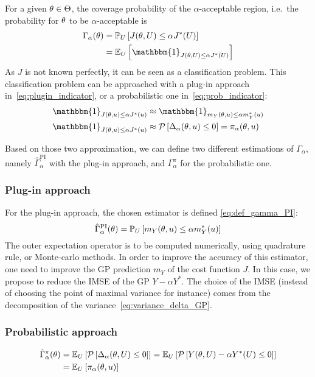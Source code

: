 \documentclass[../../Main_ManuscritThese.tex]{subfiles}
\begin{document}
For a given $\theta\in\Theta$, the coverage probability of the $\alpha$-acceptable region, i.e.\ the probability for $\theta$ to be $\alpha$-acceptable is
\begin{align}
  \Gamma_{\alpha}(\kk) &= \Prob_{U}\left[J(\kk,\UU) \leq \alpha J^*(\UU)\right] \\
                              & =\Ex_{U}\left[\mathbbm{1}_{J(\kk,\UU) \leq \alpha J^*(\UU)}\right]
\end{align}
As $J$ is not known perfectly, it can be seen as a classification problem.
This classification problem can be approached with a plug-in approach in~\cref{eq:plugin_indicator}, or a probabilistic one in~\cref{eq:prob_indicator}:
\begin{align}
  \mathbbm{1}_{J(\kk,\uu) \leq \alpha J^*(\uu)} &\approx   \mathbbm{1}_{m_Y(\kk,\uu) \leq \alpha m_Y^*(\uu)} \label{eq:plugin_indicator} \\
  \mathbbm{1}_{J(\kk,\uu) \leq \alpha J^*(\uu)} &\approx   \ProbGP\left[ \Delta_{\alpha}(\kk,\uu) \leq 0 \right] = \pi_{\alpha}(\kk,\uu) \label{eq:prob_indicator}
\end{align}

Based on those two approximation, we can define two different estimations of $\Gamma_\alpha$, namely $\hat{\Gamma}_\alpha^{\mathrm{PI}}$ with the plug-in approach, and $\Gamma_{\alpha}^{\pi}$ for the probabilistic one.

\subsubsection{Plug-in approach}
For the plug-in approach, the chosen estimator is defined \cref{eq:def_gamma_PI}:
  \begin{equation}
    \label{eq:def_gamma_PI}
    \hat{\Gamma}_{\alpha}^{\mathrm{PI}}(\theta) = \mathbb{P}_U\left[m_Y(\theta,u) \leq \alpha m_Y^*(u) \right]
  \end{equation}
  The outer expectation operator is to be computed numerically, using quadrature rule, or Monte-carlo methods. In order to improve the accuracy of this estimator, one need to improve the GP prediction $m_Y$ of the cost function $J$.
  In this case, we propose to reduce the IMSE of the GP $Y - \alpha Y^*$. The choice of the IMSE (instead of choosing the point of maximal variance for instance) comes from the decomposition of the variance~\cref{eq:variance_delta_GP}. 
  
  \subsubsection{Probabilistic approach}
\begin{align}
  \hat{\Gamma}_{\alpha}^{\pi}(\theta) &= \mathbb{E}_U\left[ \mathcal{P}\left[ \Delta_{\alpha}(\theta,U) \leq 0\right]\right] = \mathbb{E}_U\left[ \mathcal{P}\left[ Y(\theta, U) - \alpha Y^*(U) \leq 0\right]\right] \\ &= \mathbb{E}_U\left[\pi_{\alpha}(\theta,u)\right]
\end{align}
\end{document}
